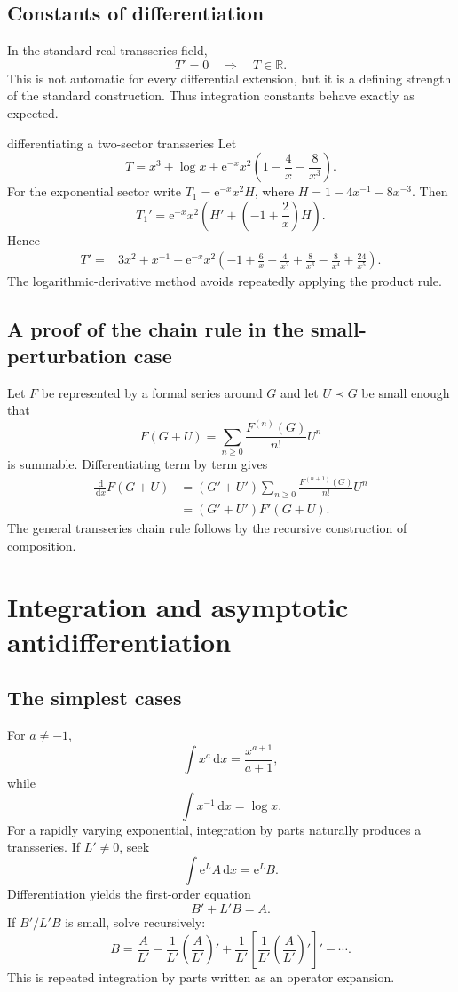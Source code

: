 \documentclass[11pt,openany]{book}
\theoremstyle{plain}
\theoremstyle{definition}
\theoremstyle{remark}
\newcommand{\R}{\mathbb{R}}
\newcommand{\dd}{\,\mathrm{d}}
\newcommand{\e}{\mathrm{e}}
\begin{document}
\section{Constants of differentiation}
In the standard real transseries field,
\[
  T'=0\quad\Longrightarrow\quad T\in\R.
\]
This is not automatic for every differential extension, but it is a defining strength of the standard construction. Thus integration constants behave exactly as expected.

\begin{workedbox}{differentiating a two-sector transseries}
Let
\[
  T=x^3+\log x+\e^{-x}x^2
  \left(1-\frac4x-\frac{8}{x^3}\right).
\]
For the exponential sector write $T_1=\e^{-x}x^2H$, where
$H=1-4x^{-1}-8x^{-3}$. Then
\[
  T_1'=\e^{-x}x^2
  \left(H'+\left(-1+\frac2x\right)H\right).
\]
Hence
\begin{align*}
  T'={}&3x^2+x^{-1}
  +\e^{-x}x^2\left(
    -1+\frac6x-\frac4{x^2}
    +\frac8{x^3}-\frac8{x^4}+\frac{24}{x^5}
  \right).
\end{align*}
The logarithmic-derivative method avoids repeatedly applying the product rule.
\end{workedbox}

\section{A proof of the chain rule in the small-perturbation case}
Let $F$ be represented by a formal series around $G$ and let $U\prec G$ be small enough that
\[
  F(G+U)=\sum_{n\ge0}\frac{F^{(n)}(G)}{n!}U^n
\]
is summable. Differentiating term by term gives
\begin{align*}
  \frac{\dd}{\dd x}F(G+U)
  &=(G'+U')
    \sum_{n\ge0}\frac{F^{(n+1)}(G)}{n!}U^n\\
  &=(G'+U')F'(G+U).
\end{align*}
The general transseries chain rule follows by the recursive construction of composition.

\chapter{Integration and asymptotic antidifferentiation}
\label{chap:integration}

\section{The simplest cases}
For $a\ne-1$,
\[
  \int x^a\dd x=\frac{x^{a+1}}{a+1},
\]
while
\[
  \int x^{-1}\dd x=\log x.
\]
For a rapidly varying exponential, integration by parts naturally produces a transseries. If $L'\ne0$, seek
\[
  \int \e^L A\dd x=\e^L B.
\]
Differentiation yields the first-order equation
\[
  B'+L'B=A.
\]
If $B'/L'B$ is small, solve recursively:
\[
  B=\frac{A}{L'}-\frac{1}{L'}
      \left(\frac{A}{L'}\right)'
    +\frac{1}{L'}\left[
       \frac{1}{L'}\left(\frac{A}{L'}\right)'
     \right]'-\cdots.
\]
This is repeated integration by parts written as an operator expansion.
\end{document}
